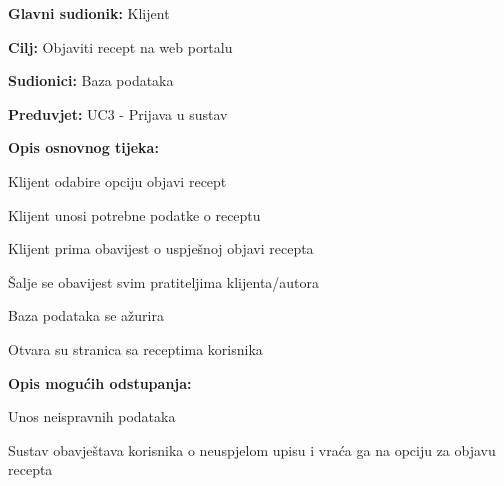 					\noindent {}
					\begin{packed_item}
	
						\item \textbf{Glavni sudionik: } Klijent
						\item  \textbf{Cilj:} Objaviti recept na web portalu
						\item  \textbf{Sudionici:} Baza podataka
						\item  \textbf{Preduvjet:} UC3 - Prijava u sustav
						\item  \textbf{Opis osnovnog tijeka:}
						
						\item[] \begin{packed_enum}
	
							\item Klijent odabire opciju objavi recept
							\item Klijent unosi potrebne podatke o receptu
							\item Klijent prima obavijest o uspješnoj objavi recepta
							\item Šalje se obavijest svim pratiteljima klijenta/autora
							\item Baza podataka se ažurira
							\item Otvara su stranica sa receptima korisnika
						\end{packed_enum}

						\item  \textbf{Opis mogućih odstupanja:}
						
						\item[] \begin{packed_item}
	
							\item[2.a] Unos neispravnih podataka
							\item[] \begin{packed_enum}
								
								\item Sustav obavještava korisnika o neuspjelom upisu i vraća ga
								na opciju za objavu recepta
								
							\end{packed_enum}
						\end{packed_item}
					\end{packed_item}

